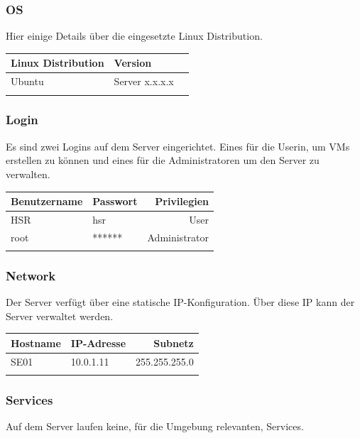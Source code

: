 \documentclass[a4,12pt]{scrartcl}
\begin{document}
\subsubsection{OS} 
Hier einige Details über die eingesetzte Linux Distribution. 
\begin{center}
    \begin{tabular}{@{} l l r@{}}\toprule    
    {Linux Distribution} & {Version}\\ \midrule
    Ubuntu & Server x.x.x.x\\ \addlinespace
    \bottomrule
    \end{tabular}
\end{center}

\subsubsection{Login}
Es sind zwei Logins auf dem Server eingerichtet. Eines für die Userin, um VMs erstellen zu können und eines für die Administratoren um den Server zu verwalten. 
\begin{center}
    \begin{tabular}{@{} l l r@{}}\toprule    
    {Benutzername} & {Passwort} & {Privilegien}\\ \midrule
    HSR & hsr & User\\ \addlinespace
    root & ****** & Administrator\\ \addlinespace
    \bottomrule
    \end{tabular}
\end{center}

\subsubsection{Network}
Der Server verfügt über eine statische IP-Konfiguration. Über diese IP kann der Server verwaltet werden. 
\begin{center}
    \begin{tabular}{@{} l l r@{}}\toprule    
    {Hostname} & {IP-Adresse} & {Subnetz}\\ \midrule
    SE01 & 10.0.1.11 & 255.255.255.0\\ \addlinespace
    \bottomrule
    \end{tabular}
\end{center}

\subsubsection{Services}
Auf dem Server laufen keine, für die Umgebung relevanten, Services. 
\end{document}
